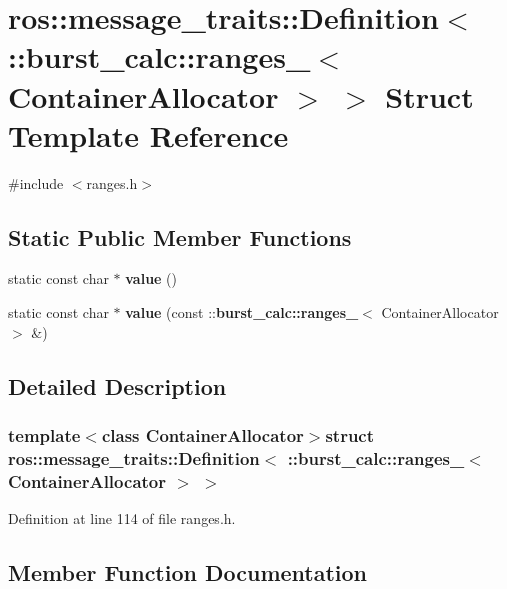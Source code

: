 \section{ros\-:\-:message\-\_\-traits\-:\-:\-Definition$<$ \-:\-:burst\-\_\-calc\-:\-:ranges\-\_\-$<$ \-Container\-Allocator $>$ $>$ \-Struct \-Template \-Reference}
\label{structros_1_1message__traits_1_1Definition_3_01_1_1burst__calc_1_1ranges___3_01ContainerAllocator_01_4_01_4}


{\ttfamily \#include $<$ranges.\-h$>$}

\subsection*{\-Static \-Public \-Member \-Functions}
\begin{DoxyCompactItemize}
\item 
static const char $\ast$ {\bf value} ()
\item 
static const char $\ast$ {\bf value} (const \-::{\bf burst\-\_\-calc\-::ranges\-\_\-}$<$ \-Container\-Allocator $>$ \&)
\end{DoxyCompactItemize}


\subsection{\-Detailed \-Description}
\subsubsection*{template$<$class Container\-Allocator$>$struct ros\-::message\-\_\-traits\-::\-Definition$<$ \-::burst\-\_\-calc\-::ranges\-\_\-$<$ Container\-Allocator $>$ $>$}



\-Definition at line 114 of file ranges.\-h.



\subsection{\-Member \-Function \-Documentation}
